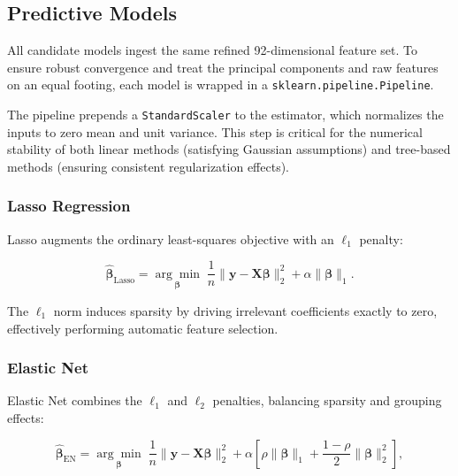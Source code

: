 \subsection{Predictive Models}

All candidate models ingest the same refined 92-dimensional feature set. To ensure robust convergence and treat the principal components and raw features on an equal footing, each model is wrapped in a \texttt{sklearn.pipeline.Pipeline}. 

The pipeline prepends a \texttt{StandardScaler} to the estimator, which normalizes the inputs to zero mean and unit variance. This step is critical for the numerical stability of both linear methods (satisfying Gaussian assumptions) and tree-based methods (ensuring consistent regularization effects).

\subsubsection{Lasso Regression}

Lasso augments the ordinary least-squares objective with an $\ell_1$ penalty:

\begin{equation}
  \hat{\boldsymbol{\beta}}_{\text{Lasso}} =
  \underset{\boldsymbol{\beta}}{\arg\min}\;
  \frac{1}{n}\|\mathbf{y} - \mathbf{X}\boldsymbol{\beta}\|_2^2
  + \alpha \|\boldsymbol{\beta}\|_1.
  \label{eq:lasso}
\end{equation}

The $\ell_1$ norm induces sparsity by driving irrelevant coefficients exactly
to zero, effectively performing automatic feature selection.

\subsubsection{Elastic Net}

Elastic Net combines the $\ell_1$ and $\ell_2$ penalties,
balancing sparsity and grouping effects:

\begin{equation}
  \hat{\boldsymbol{\beta}}_{\text{EN}} =
  \underset{\boldsymbol{\beta}}{\arg\min}\;
  \frac{1}{n}\|\mathbf{y} - \mathbf{X}\boldsymbol{\beta}\|_2^2
  + \alpha\!\left[\rho\|\boldsymbol{\beta}\|_1
    + \frac{1-\rho}{2}\|\boldsymbol{\beta}\|_2^2\right],
  \label{eq:elasticnet}
\end{equation}

